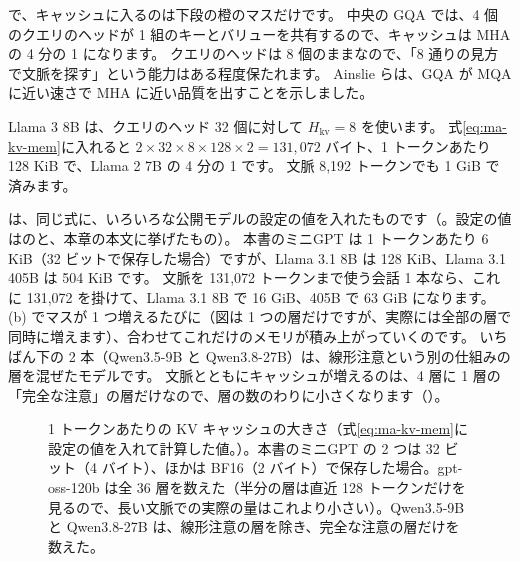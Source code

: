 で、キャッシュに入るのは下段の橙のマスだけです。
中央の GQA では、4 個のクエリのヘッドが 1 組のキーとバリューを共有するので、キャッシュは MHA の 4 分の 1 になります。
クエリのヘッドは 8 個のままなので、「8 通りの見方で文脈を探す」という能力はある程度保たれます。
Ainslie らは、GQA が MQA に近い速さで MHA に近い品質を出すことを示しました\cite{ainslie2023gqa}。

Llama 3 8B は、クエリのヘッド 32 個に対して $H_{\mathrm{kv}}=8$ を使います。
式\eqref{eq:ma-kv-mem}に入れると $2\times32\times8\times128\times2=131{,}072$ バイト、1 トークンあたり 128 KiB で、Llama 2 7B の 4 分の 1 です。
文脈 8,192 トークンでも 1 GiB で済みます。

は、同じ式に、いろいろな公開モデルの設定の値を入れたものです（。設定の値はのと、本章の本文に挙げたもの）。
本書のミニGPT は 1 トークンあたり 6 KiB（32 ビットで保存した場合）ですが、Llama 3.1 8B は 128 KiB、Llama 3.1 405B は 504 KiB です。
文脈を 131,072 トークンまで使う会話 1 本なら、これに 131,072 を掛けて、Llama 3.1 8B で 16 GiB、405B で 63 GiB になります。
(b) でマスが 1 つ増えるたびに（図は 1 つの層だけですが、実際には全部の層で同時に増えます）、合わせてこれだけのメモリが積み上がっていくのです。
いちばん下の 2 本（Qwen3.5-9B と Qwen3.8-27B）は、線形注意という別の仕組みの層を混ぜたモデルです。
文脈とともにキャッシュが増えるのは、4 層に 1 層の「完全な注意」の層だけなので、層の数のわりに小さくなります（）。

\begin{figure}[tbp]
\centering
{}
\caption{1 トークンあたりの KV キャッシュの大きさ（式\eqref{eq:ma-kv-mem}に設定の値を入れて計算した値。）。本書のミニGPT の 2 つは 32 ビット（4 バイト）、ほかは BF16（2 バイト）で保存した場合。gpt-oss-120b は全 36 層を数えた（半分の層は直近 128 トークンだけを見るので、長い文脈での実際の量はこれより小さい）。Qwen3.5-9B と Qwen3.8-27B は、線形注意の層を除き、完全な注意の層だけを数えた。}
\label{fig:ma-kv-mem}
\end{figure}

